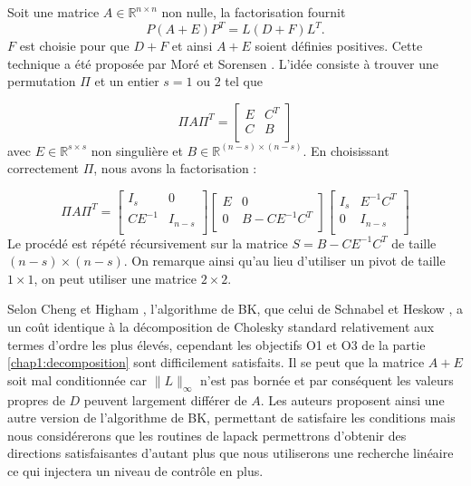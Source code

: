 Soit une matrice $A \in \mathbb{R}^{n\times n}$ non nulle, la factorisation fournit $$P(A+E)P^T=L(D+F)L^T.$$ $F$ est choisie pour que $D+F$ et ainsi
$A+E$ soient d\'efinies positives. Cette technique a \'et\'e propos\'ee par Mor\'e et Sorensen \cite{More}. L'id\'ee consiste \`a 
trouver une permutation $\Pi$ et un entier $s=1$ ou $2$ tel que 

\begin{equation*}
\Pi A \Pi^T = 
\left[
\begin{array}{cc}
 E & C^T \\
 C & B \\
\end{array}\right]
\end{equation*}
avec $E\in \mathbb{R}^{s\times s}$ non singuli\`ere et $B\in \mathbb{R}^{(n-s)\times (n-s)}$. En choisissant correctement $\Pi$, nous avons la factorisation :

\begin{equation*}
\Pi A \Pi^T = 
\left[
\begin{array}{cc}
 I_s & 0 \\
 CE^{-1} & I_{n-s} \\
\end{array}\right]
\left[
\begin{array}{cc}
 E & 0 \\
 0 & B-CE^{-1}C^T \\
\end{array}\right]
\left[
\begin{array}{cc}
 I_s & E^{-1}C^T \\
 0 & I_{n-s} \\
\end{array}\right]
\end{equation*}
Le proc\'ed\'e est r\'ep\'et\'e r\'ecursivement sur la matrice $S=B-CE^{-1}C^T$ de taille\\ $(n-s)\times (n-s)$. On remarque ainsi qu'au lieu
d'utiliser un pivot de taille $1\times 1$, on peut utiliser une matrice $2\times2$.




 Selon Cheng et Higham \cite{Higham}, l'algorithme de BK, que celui de Schnabel et Heskow \cite{choleskymod}, a un coût identique
 \`a la d\'ecomposition de Cholesky standard relativement
aux termes d'ordre les plus \'elev\'es, cependant les objectifs O1 et O3 de la partie \ref{chap1:decomposition} sont difficilement satisfaits.
Il se peut que la matrice $A+E$ soit mal conditionn\'ee car $\lVert L \rVert_{\infty}$ n'est pas born\'ee et par cons\'equent les valeurs propres de $D$ peuvent 
largement diff\'erer de $A$. 
Les auteurs proposent ainsi une autre version de l'algorithme de BK, permettant de satisfaire les conditions mais nous consid\'ererons que 
les routines de lapack permettrons d'obtenir des directions satisfaisantes d'autant plus que nous utiliserons une recherche lin\'eaire ce qui injectera
un niveau de contrôle en plus.

